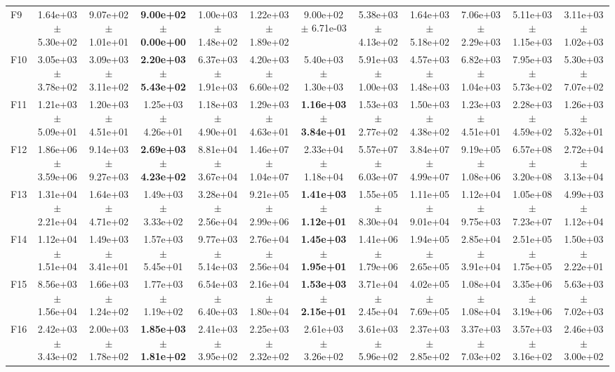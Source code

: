 \begin{table}
{\begin{tabular}{lccccccccccc}
F9 & 1.64e+03 $\pm$ 5.30e+02 & 9.07e+02 $\pm$ 1.01e+01 & \textbf{9.00e+02 $\pm$ 0.00e+00} & 1.00e+03 $\pm$ 1.48e+02 & 1.22e+03 $\pm$ 1.89e+02 & 9.00e+02 $\pm$ 6.71e-03 & 5.38e+03 $\pm$ 4.13e+02 & 1.64e+03 $\pm$ 5.18e+02 & 7.06e+03 $\pm$ 2.29e+03 & 5.11e+03 $\pm$ 1.15e+03 & 3.11e+03 $\pm$ 1.02e+03 \\
F10 & 3.05e+03 $\pm$ 3.78e+02 & 3.09e+03 $\pm$ 3.11e+02 & \textbf{2.20e+03 $\pm$ 5.43e+02} & 6.37e+03 $\pm$ 1.91e+03 & 4.20e+03 $\pm$ 6.60e+02 & 5.40e+03 $\pm$ 1.30e+03 & 5.91e+03 $\pm$ 1.00e+03 & 4.57e+03 $\pm$ 1.48e+03 & 6.82e+03 $\pm$ 1.04e+03 & 7.95e+03 $\pm$ 5.73e+02 & 5.30e+03 $\pm$ 7.07e+02 \\
F11 & 1.21e+03 $\pm$ 5.09e+01 & 1.20e+03 $\pm$ 4.51e+01 & 1.25e+03 $\pm$ 4.26e+01 & 1.18e+03 $\pm$ 4.90e+01 & 1.29e+03 $\pm$ 4.63e+01 & \textbf{1.16e+03 $\pm$ 3.84e+01} & 1.53e+03 $\pm$ 2.77e+02 & 1.50e+03 $\pm$ 4.38e+02 & 1.23e+03 $\pm$ 4.51e+01 & 2.28e+03 $\pm$ 4.59e+02 & 1.26e+03 $\pm$ 5.32e+01 \\
F12 & 1.86e+06 $\pm$ 3.59e+06 & 9.14e+03 $\pm$ 9.27e+03 & \textbf{2.69e+03 $\pm$ 4.23e+02} & 8.81e+04 $\pm$ 3.67e+04 & 1.46e+07 $\pm$ 1.04e+07 & 2.33e+04 $\pm$ 1.18e+04 & 5.57e+07 $\pm$ 6.03e+07 & 3.84e+07 $\pm$ 4.99e+07 & 9.19e+05 $\pm$ 1.08e+06 & 6.57e+08 $\pm$ 3.20e+08 & 2.72e+04 $\pm$ 3.13e+04 \\
F13 & 1.31e+04 $\pm$ 2.21e+04 & 1.64e+03 $\pm$ 4.71e+02 & 1.49e+03 $\pm$ 3.33e+02 & 3.28e+04 $\pm$ 2.56e+04 & 9.21e+05 $\pm$ 2.99e+06 & \textbf{1.41e+03 $\pm$ 1.12e+01} & 1.55e+05 $\pm$ 8.30e+04 & 1.11e+05 $\pm$ 9.01e+04 & 1.12e+04 $\pm$ 9.75e+03 & 1.05e+08 $\pm$ 7.23e+07 & 4.99e+03 $\pm$ 1.12e+04 \\
F14 & 1.12e+04 $\pm$ 1.51e+04 & 1.49e+03 $\pm$ 3.41e+01 & 1.57e+03 $\pm$ 5.45e+01 & 9.77e+03 $\pm$ 5.14e+03 & 2.76e+04 $\pm$ 2.56e+04 & \textbf{1.45e+03 $\pm$ 1.95e+01} & 1.41e+06 $\pm$ 1.79e+06 & 1.94e+05 $\pm$ 2.65e+05 & 2.85e+04 $\pm$ 3.91e+04 & 2.51e+05 $\pm$ 1.75e+05 & 1.50e+03 $\pm$ 2.22e+01 \\
F15 & 8.56e+03 $\pm$ 1.56e+04 & 1.66e+03 $\pm$ 1.24e+02 & 1.77e+03 $\pm$ 1.19e+02 & 6.54e+03 $\pm$ 6.40e+03 & 2.16e+04 $\pm$ 1.80e+04 & \textbf{1.53e+03 $\pm$ 2.15e+01} & 3.71e+04 $\pm$ 2.45e+04 & 4.02e+05 $\pm$ 7.69e+05 & 1.08e+04 $\pm$ 1.08e+04 & 3.35e+06 $\pm$ 3.19e+06 & 5.63e+03 $\pm$ 7.02e+03 \\
F16 & 2.42e+03 $\pm$ 3.43e+02 & 2.00e+03 $\pm$ 1.78e+02 & \textbf{1.85e+03 $\pm$ 1.81e+02} & 2.41e+03 $\pm$ 3.95e+02 & 2.25e+03 $\pm$ 2.32e+02 & 2.61e+03 $\pm$ 3.26e+02 & 3.61e+03 $\pm$ 5.96e+02 & 2.37e+03 $\pm$ 2.85e+02 & 3.37e+03 $\pm$ 7.03e+02 & 3.57e+03 $\pm$ 3.16e+02 & 2.46e+03 $\pm$ 3.00e+02 \\

\end{tabular}}
\end{table}
